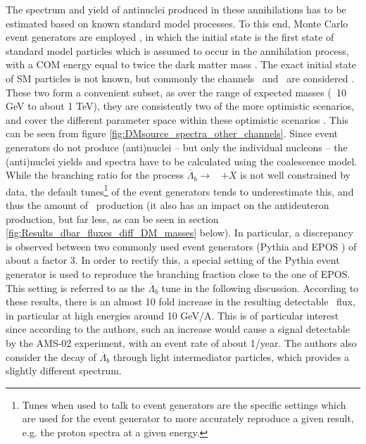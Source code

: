 The spectrum and yield of antinuclei produced in these annihilations has to be estimated based on known standard model processes. To this end, Monte Carlo event generators are employed \cite{Ibarra:2012cc, Coogan_2017, cookbook}, in which the initial state is the first state of standard model particles which is assumed to occur in the annihilation process, with a COM energy equal to twice the dark matter mass \dmm \cite{cookbook}.%
The exact initial state of SM particles is not known, but commonly the channels \WW\ and \bb\ are considered \cite{Coogan_2017, Ibarra:2012cc}. These two form a convenient subset, as over the range of expected masses (~10 GeV to about 1 TeV), they are consistently two of the more optimistic scenarios, and cover the different parameter space within these optimistic scenarios \cite{cookbook}. This can be seen from figure \ref{fig:DMsource_spectra_other_channels}. 
Since event generators do not produce (anti)nuclei -- but only the individual nucleons -- the (anti)nuclei yields and spectra have to be calculated using the coalescence model.
While the branching ratio for the process $\overline{\Lambda}_b \rightarrow $ \ahe\ $+X$ is not well constrained by data, the default tunes\footnote{Tunes when used to talk to event generators are the specific settings which are used for the event generator to more accurately reproduce a given result, e.g. the proton spectra at a given energy.} of the event generators tends to underestimate this, and thus the amount of \ahe\ production (it also has an impact on the antideuteron production, but far less, as can be seen in section \ref{fig:Results_dbar_fluxes_diff_DM_masses} below). In particular, a discrepancy is observed between two commonly used event generators (Pythia \cite{pythia} and EPOS \cite{EPOS}) of about a factor 3. In order to rectify this, a special setting of the Pythia event generator is used to reproduce the branching fraction close to the one of EPOS. This setting is referred to as the $\overline{\Lambda}_b$ tune in the following discussion. According to these results, there is an almost 10 fold increase in the resulting detectable \ahe\ flux, in particular at high energies around 10 GeV/A. This is of particular interest since according to the authors, such an increase would cause a signal detectable by the AMS-02 experiment, with an event rate of about 1/year.  The authors also consider the decay of $\overline{\Lambda}_b$ through light intermediator particles, which provides a slightly different spectrum.\\
